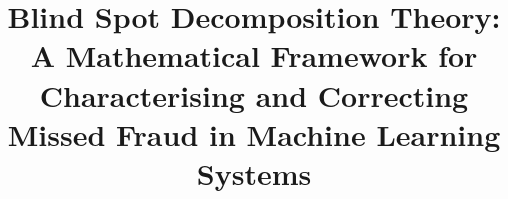 \documentclass[journal]{IEEEtran}
\begin{document}
\title{Blind Spot Decomposition Theory: A Mathematical Framework for Characterising and Correcting Missed Fraud in Machine Learning Systems}

\author{
}

\maketitle

\end{document}
